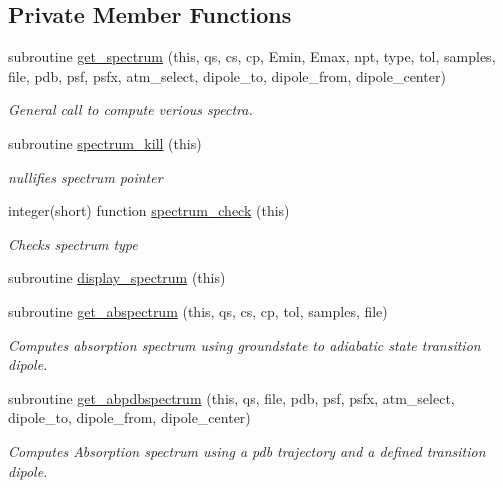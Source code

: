 \subsection*{Private Member Functions}
\begin{DoxyCompactItemize}
\item 
subroutine \hyperlink{classspectrometer__class_a068171434fa75613677e6357291df1fe}{get\+\_\+spectrum} (this, qs, cs, cp, Emin, Emax, npt, type, tol, samples, file, pdb, psf, psfx, atm\+\_\+select, dipole\+\_\+to, dipole\+\_\+from, dipole\+\_\+center)
\begin{DoxyCompactList}\small\item\em General call to compute verious spectra. \end{DoxyCompactList}\item 
subroutine \hyperlink{classspectrometer__class_aabaa46560b8ea49cd16b6c11a8a2fe65}{spectrum\+\_\+kill} (this)
\begin{DoxyCompactList}\small\item\em nullifies spectrum pointer \end{DoxyCompactList}\item 
integer(short) function \hyperlink{classspectrometer__class_a94382eb7e533e6a74dd79200ca0e38ed}{spectrum\+\_\+check} (this)
\begin{DoxyCompactList}\small\item\em Checks spectrum type \end{DoxyCompactList}\item 
subroutine \hyperlink{classspectrometer__class_a3f9fc6096d581c5a7094174b47898d10}{display\+\_\+spectrum} (this)
\item 
subroutine \hyperlink{classspectrometer__class_ad2c4936524c8702e1c4e53a54a043f31}{get\+\_\+abspectrum} (this, qs, cs, cp, tol, samples, file)
\begin{DoxyCompactList}\small\item\em Computes absorption spectrum using groundstate to adiabatic state transition dipole. \end{DoxyCompactList}\item 
subroutine \hyperlink{classspectrometer__class_af1fc802879075c7e5e42ef4baac69445}{get\+\_\+abpdbspectrum} (this, qs, file, pdb, psf, psfx, atm\+\_\+select, dipole\+\_\+to, dipole\+\_\+from, dipole\+\_\+center)
\begin{DoxyCompactList}\small\item\em Computes Absorption spectrum using a pdb trajectory and a defined transition dipole. \end{DoxyCompactList}\end{DoxyCompactItemize}
